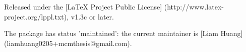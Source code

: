 Released under the [LaTeX Project Public License]
(http://www.latex-project.org/lppl.txt), v1.3c or later.

The package has status 'maintained': the current maintainer is
[Liam Huang](liamhuang0205+mcmthesis@gmail.com).
